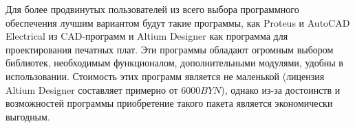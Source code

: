 Для более продвинутых пользователей из всего выбора программного обеспечения лучшим вариантом
будут такие программы, как Proteus и AutoCAD Electrical из CAD-программ и Altium Designer как программа для
проектирования печатных плат. Эти программы обладают огромным выбором библиотек, необходимым
функционалом, дополнительными модулями, удобны в использовании. Стоимость этих программ является не
маленькой (лицензия Altium Designer составляет примерно от $6000BYN$), однако из-за достоинств и возможностей
программы приобретение такого пакета является экономически выгодным.